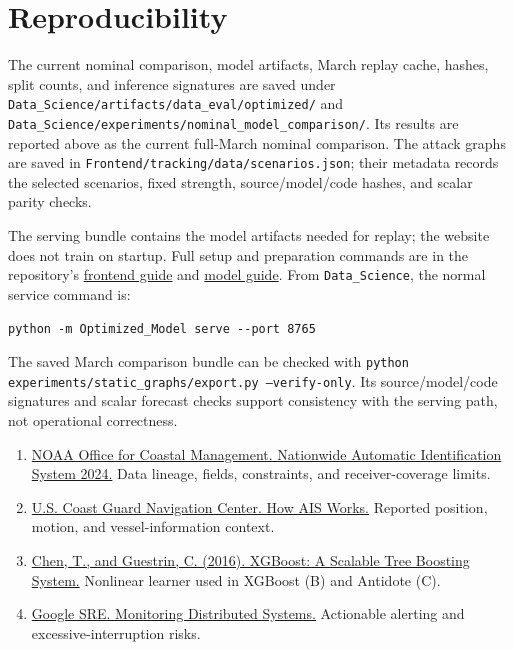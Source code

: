 \documentclass[11pt]{article}
\begin{document}
\section{Reproducibility}
The current nominal comparison, model artifacts, March replay cache, hashes, split counts, and inference signatures are saved under \texttt{Data\_Science/artifacts/data\_eval/optimized/} and \texttt{Data\_Science/experiments/nominal\_model\_comparison/}. Its results are reported above as the current full-March nominal comparison. The attack graphs are saved in \texttt{Frontend/tracking/data/scenarios.json}; their metadata records the selected scenarios, fixed strength, source/model/code hashes, and scalar parity checks.

The serving bundle contains the model artifacts needed for replay; the website does not train on startup. Full setup and preparation commands are in the repository's \href{https://github.com/JeremyBarry03/2026_WM_Hackathon/blob/main/Frontend/README.md}{frontend guide} and \href{https://github.com/JeremyBarry03/2026_WM_Hackathon/blob/main/Data_Science/Optimized_Model/README.md}{model guide}. From \texttt{Data\_Science}, the normal service command is:
\begin{verbatim}
python -m Optimized_Model serve --port 8765
\end{verbatim}
The saved March comparison bundle can be checked with \texttt{python experiments/static\_graphs/export.py --verify-only}. Its source/model/code signatures and scalar forecast checks support consistency with the serving path, not operational correctness.

\begin{enumerate}
\item \href{https://www.fisheries.noaa.gov/inport/item/73064}{NOAA Office for Coastal Management. Nationwide Automatic Identification System 2024.} Data lineage, fields, constraints, and receiver-coverage limits.
\item \href{https://www.navcen.uscg.gov/how-ais-works}{U.S. Coast Guard Navigation Center. How AIS Works.} Reported position, motion, and vessel-information context.
\item \href{https://arxiv.org/abs/1603.02754}{Chen, T., and Guestrin, C. (2016). XGBoost: A Scalable Tree Boosting System.} Nonlinear learner used in XGBoost (B) and Antidote (C).
\item \href{https://sre.google/sre-book/monitoring-distributed-systems/}{Google SRE. Monitoring Distributed Systems.} Actionable alerting and excessive-interruption risks.
\end{enumerate}
\end{document}
